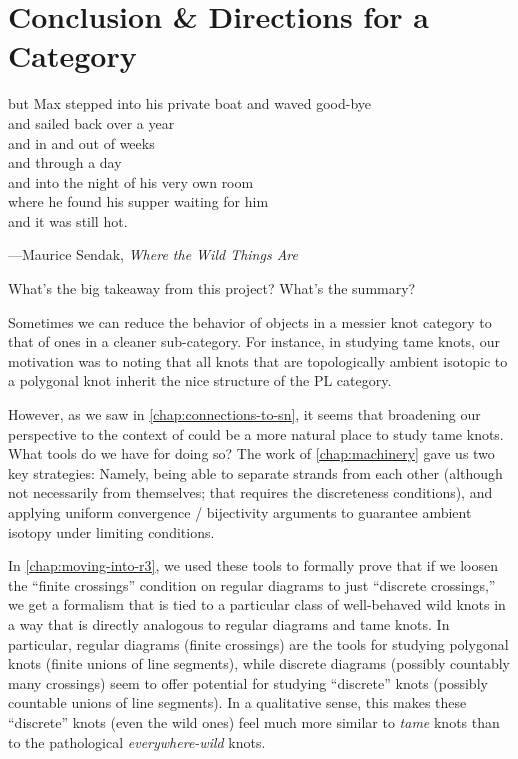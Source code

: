 \chapter{Conclusion \& Directions for a Category}\label{chap:summary}
\setlength{}
\epigraph{
  but Max stepped into his private boat and waved good-bye\\
  and sailed back over a year\\
  and in and out of weeks\\
  and through a day\\
  and into the night of his very own room\\
  where he found his supper waiting for him\\
  and it was still hot.}{
  ---Maurice Sendak, \emph{Where the Wild Things Are}
}

What's the big takeaway from this project? What's the summary?

Sometimes we can reduce the behavior of objects in a messier knot
category to that of ones in a cleaner sub-category. For instance, in
studying tame knots, our motivation was to noting that all knots that
are topologically ambient isotopic to a polygonal knot inherit the
nice structure of the PL category. %

However, as we saw in \cref{chap:connections-to-sn}, it seems that
broadening our perspective to the context of  could be a more natural place to study tame knots. What
tools do we have for doing so? The work of \cref{chap:machinery} gave
us two key strategies: Namely, being able to separate strands from
each other (although not necessarily from themselves; that requires
the discreteness conditions), and applying uniform convergence /
bijectivity arguments to guarantee ambient isotopy under limiting
conditions.

In \cref{chap:moving-into-r3}, we used these tools to formally prove
that if we loosen the ``finite crossings'' condition on regular
diagrams to just ``discrete crossings,'' we get a formalism that is
tied to a particular class of well-behaved wild knots in a way that is
directly analogous to regular diagrams and tame knots. In particular,
regular diagrams (finite crossings) are the tools for studying
polygonal knots (finite unions of line segments), while discrete
diagrams (possibly countably many crossings) seem to offer potential
for studying ``discrete'' knots (possibly countable unions of line
segments). In a qualitative sense, this makes these ``discrete'' knots
(even the wild ones) feel much more similar to \emph{tame} knots than
to the pathological \emph{everywhere-wild} knots.

